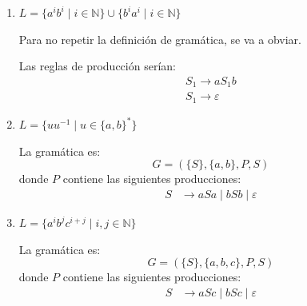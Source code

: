 \documentclass[12pt]{report} %
\begin{document}
\begin{ejercicioresuelto}
\begin{enumerate}
    \item \( L = \{a^i b^i \mid i \in \mathbb{N}\} \cup \{b^i a^i \mid i \in \mathbb{N}\} \)

    \begin{solucion}
    Para no repetir la definición de gramática, se va a obviar.

    Las reglas de producción serían:
    \begin{align*}
    S_1 \rightarrow aS_1b \\
    S_1 \rightarrow \varepsilon
    \end{align*}

    \end{solucion}

    \item \( L = \{uu^{-1} \mid u \in \{a, b\}^*\} \)

    \begin{solucion}
    La gramática es:
    \[
    G = (\{S\}, \{a, b\}, P, S)
    \]
    donde \( P \) contiene las siguientes producciones:
    \[
    \begin{aligned}
        S &\to aSa \mid bSb \mid \varepsilon
    \end{aligned}
    \]
    \end{solucion}

    \item \( L = \{a^i b^j c^{i+j} \mid i, j \in \mathbb{N}\} \)

    \begin{solucion}
    La gramática es:
    \[
    G = (\{S\}, \{a, b, c\}, P, S)
    \]
    donde \( P \) contiene las siguientes producciones:
    \[
    \begin{aligned}
        S &\to aSc \mid bSc \mid \varepsilon
    \end{aligned}
    \]
    \end{solucion}
\end{enumerate}
\end{ejercicioresuelto}
\end{document}
